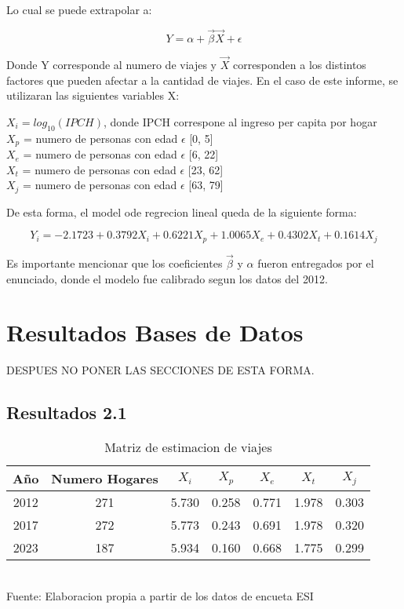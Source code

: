 \documentclass[12pt]{article} %
\begin{document}
Lo cual se puede extrapolar a:

\begin{equation}
    Y = \alpha + \vec{\beta}\vec{X} + \epsilon
\end{equation}

Donde Y corresponde al numero de viajes y $\vec{X}$ corresponden a los distintos factores que pueden afectar a la cantidad de viajes. En el caso de este informe, se utilizaran las siguientes variables X:

\begin{center}
    $X_i = log_{10}(IPCH)$, donde IPCH correspone al ingreso per capita por hogar\\
    $X_p$ = numero de personas con edad $\epsilon$ [0, 5]\\
    $X_e$ = numero de personas con edad $\epsilon$ [6, 22]\\
    $X_t$ = numero de personas con edad $\epsilon$ [23, 62]\\
    $X_j$ = numero de personas con edad $\epsilon$ [63, 79]\\
\end{center}

De esta forma, el model ode regrecion lineal queda de la siguiente forma:

\begin{equation}
    Y_i = -2.1723 + 0.3792X_i + 0.6221X_p + 1.0065X_e + 0.4302X_t + 0.1614X_j
\end{equation}

Es importante mencionar que los coeficientes $\vec{\beta}$ y $\alpha$ fueron entregados por el enunciado, donde el modelo fue calibrado segun los datos del 2012.

\section{Resultados Bases de Datos}
DESPUES NO PONER LAS SECCIONES DE ESTA FORMA.

\subsection{Resultados 2.1}

\begin{table}[H]
    \centering
    \caption{Matriz de estimacion de viajes}
    \vspace{0.2cm}
    \begin{tabular}{|c|c|c|c|c|c|c|}
        \hline
        Año & Numero Hogares & $X_i$ & $X_p$ & $X_e$ & $X_t$ & $X_j$ \\
        \hline
        2012 & 271 &5.730 & 0.258 & 0.771 & 1.978 & 0.303 \\
        2017 & 272 &5.773 & 0.243 & 0.691 & 1.978 & 0.320 \\
        2023 & 187 &5.934 & 0.160 & 0.668 & 1.775 & 0.299 \\
        \hline
    \end{tabular}
    \vspace{0.2cm}
    \\Fuente: Elaboracion propia a partir de los datos de encueta ESI
\end{table}
\end{document}
